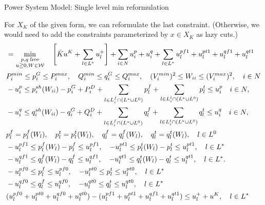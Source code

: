 \documentclass[xcolor=dvipsnames]{beamer}
\newcommand{\p}[1]{p^{#1}}
\newcommand{\q}[1]{q^{#1}}
\newcommand{\ii}{i}
\newcommand{\llll}{l}
\newcommand{\from}{f}
\newcommand{\tto}{t}
\newcommand{\WW}{W}
\newcommand{\WSet}{\mathcal{W}}
\newcommand{\Lines}{L}
\begin{document}
\begin{frame}{Power System Model: Single level min reformulation}
\begin{footnotesize}
For $X_K$ of the given form, we can reformulate the last constraint. (Otherwise, we would need to add the constraints parameterized by $x \in X_K$ as lazy cuts.)
\begin{subequations}\label{MinMaxRef}
\begin{align}
 &=\min_{\substack{p,q\;\text{free}\\ u \geqq 0,W\in \WSet}} \quad 
 \left[\bar{K} u^K + \sum_{l \in L^*} u_l^+\right] + \sum_{i \in N} u_i^p + u_i^q  + \sum_{l \in L^*} u_l^{pf1} + u_l^{pt1} + u_l^{qf1} + u_l^{qt1}\\
  & P_i^{min} \leq p_i^G \leq P_i^{max}, \quad Q_i^{min} \leq q_i^G \leq Q_i^{max}, \quad (V_i^{min})^2 \leq W_{ii} \leq (V_i^{max})^2,\quad i\in N \notag \\
  & -u_i^p \le p_i^{sh}(\WW_{ii}) - p^G_i + P^D_i 
	+ \sum_{\llll \in \Lines_\ii^{\from} \cap (L^* \cup L^0)  } p_{l}^{f}  
	+\sum_{\llll \in \Lines_\ii^{\tto} \cap (L^* \cup L^0) } p_{l}^{t} 
	\le u_i^p \quad i\in N, \notag\\ 
  & -u_i^q \le q_i^{sh}(\WW_{ii}) - q^G_i + Q^D_i 
	+ \sum_{\llll \in \Lines_\ii^{\from} \cap (L^* \cup L^0) } q_{l}^{f}
	+ \sum_{\llll \in \Lines_\ii^{\tto} \cap (L^* \cup L^0) } q_{l}^{t} 
	\le u_i^q \quad i\in N, \notag \\
& p_{l}^{f}=\p{\from}_{\llll}(\WW_\llll),\quad p_l^t=\p{\tto}_{\llll}(\WW_\llll),\quad q_l^f=\q{\from}_{\llll}(\WW_\llll),\quad q_l^t=\q{\tto}_{\llll}(\WW_\llll) , \quad \llll \in L^0 \notag \\
& -u_l^{pf1} \le \p{\from}_{\llll}(\WW_\llll) - p_{l}^{f} \le u_l^{pf1}, \quad
 -u_l^{pt1} \le \p{\tto}_{\llll}(\WW_\llll)  - p_{l}^{t} \le u_l^{pt1}, \quad \llll \in L^* \notag \\
& -u_l^{qf1} \le \q{\from}_{\llll}(\WW_\llll) - q_{l}^{f} \le u_l^{qf1}, \quad 
 -u_l^{qt1} \le \q{\tto}_{\llll}(\WW_\llll)  - q_{l}^{t} \le u_l^{qt1}, \quad \llll \in L^*. \notag \\
& -u_l^{pf0} \le p_l^f \le u_l^{pf0},\quad-u_l^{pt0} \le p_l^t \le u_l^{pt0}, \quad l \in L^* \notag\\ 
& -u_l^{qf0} \le q_l^f \le u_l^{qf0},\quad-u_l^{qt0} \le q_l^t \le u_l^{qt0}, \quad l \in L^* \notag \\ 
& (u_l^{pf0} + u_l^{pt0} + u_l^{qf0} + u_l^{qt0}) - (u_l^{pf1} + u_l^{pt1} + u_l^{qf1} + u_l^{qt1}) \le u_l^+ + u^K,\quad l \in L^* \label{RefOverXK}
\end{align}
\end{subequations}
\end{footnotesize}
\end{frame}
\end{document}
